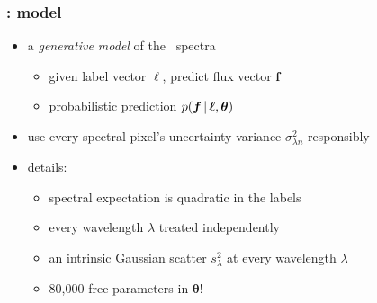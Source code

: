 \documentclass[pdftex]{beamer}
\begin{document}
\newcommand{\flux}{f}
\newcommand{\fluxes}{\boldsymbol{\flux}}
\newcommand{\labels}{\boldsymbol{\ell}}
\newcommand{\pars}{\boldsymbol{\theta}}

\begin{frame}
  \frametitle{\tc: model}
  \begin{itemize}
  \item a \emph{generative model} of the \apogee\ spectra
    \begin{itemize}
    \item given label vector $\labels$, predict flux vector $\fluxes$
    \item probabilistic prediction $p(\fluxes\given\labels,\pars)$
    \end{itemize}
  \item use every spectral pixel's uncertainty variance $\sigma^2_{\lambda n}$ responsibly
  \item details:
    \begin{itemize}
    \item spectral expectation is quadratic in the labels
    \item every wavelength $\lambda$ treated independently
    \item an intrinsic Gaussian scatter $s^2_\lambda$ at every wavelength $\lambda$
    \item 80,000 free parameters in $\pars$!
    \end{itemize}
  \end{itemize}
\end{frame}
\end{document}
